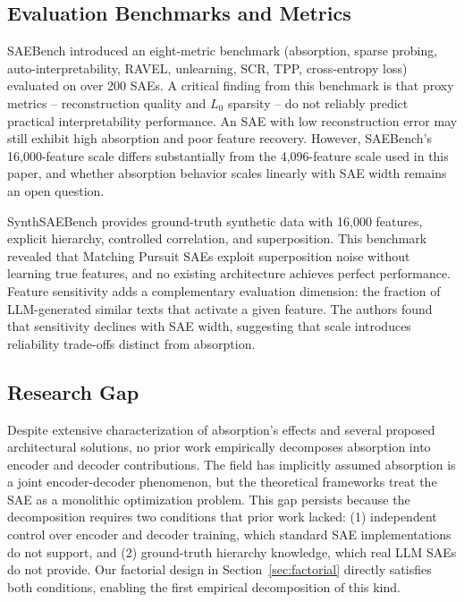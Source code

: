 \documentclass{article}
\begin{document}
\subsection{Evaluation Benchmarks and Metrics}

SAEBench \citep{karvonen2025} introduced an eight-metric benchmark (absorption, sparse probing, auto-interpretability, RAVEL, unlearning, SCR, TPP, cross-entropy loss) evaluated on over 200 SAEs. A critical finding from this benchmark is that proxy metrics -- reconstruction quality and $L_0$ sparsity -- do not reliably predict practical interpretability performance. An SAE with low reconstruction error may still exhibit high absorption and poor feature recovery. However, SAEBench's 16,000-feature scale differs substantially from the 4,096-feature scale used in this paper, and whether absorption behavior scales linearly with SAE width remains an open question.

SynthSAEBench \citep{chanin2026} provides ground-truth synthetic data with 16,000 features, explicit hierarchy, controlled correlation, and superposition. This benchmark revealed that Matching Pursuit SAEs exploit superposition noise without learning true features, and no existing architecture achieves perfect performance. Feature sensitivity \citep{hu2025} adds a complementary evaluation dimension: the fraction of LLM-generated similar texts that activate a given feature. The authors found that sensitivity declines with SAE width, suggesting that scale introduces reliability trade-offs distinct from absorption.

\subsection{Research Gap}

Despite extensive characterization of absorption's effects and several proposed architectural solutions, no prior work empirically decomposes absorption into encoder and decoder contributions. The field has implicitly assumed absorption is a joint encoder-decoder phenomenon, but the theoretical frameworks \citep{marks2025, cui2025} treat the SAE as a monolithic optimization problem. This gap persists because the decomposition requires two conditions that prior work lacked: (1) independent control over encoder and decoder training, which standard SAE implementations do not support, and (2) ground-truth hierarchy knowledge, which real LLM SAEs do not provide. Our factorial design in Section~\ref{sec:factorial} directly satisfies both conditions, enabling the first empirical decomposition of this kind.
\end{document}
